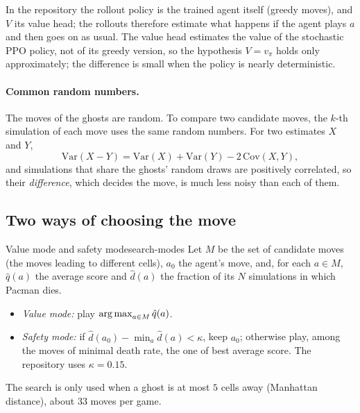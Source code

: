 In the repository the rollout policy is the trained agent itself (greedy
moves), and $V$ its value head; the rollouts therefore estimate what
happens if the agent plays $a$ and then goes on as usual. The value head
estimates the value of the stochastic PPO policy, not of its greedy
version, so the hypothesis $V = v_\pi$ holds only approximately; the
difference is small when the policy is nearly deterministic.

\paragraph{Common random numbers.} The moves of the ghosts are random. To
compare two candidate moves, the $k$-th simulation of each move uses the
same random numbers. For two estimates $X$ and $Y$,
\begin{equation}
  \mathrm{Var}(X - Y) = \mathrm{Var}(X) + \mathrm{Var}(Y) - 2\,
  \mathrm{Cov}(X, Y),
\end{equation}
and simulations that share the ghosts' random draws are positively
correlated, so their \emph{difference}, which decides the move, is much
less noisy than each of them.

\subsection{Two ways of choosing the move}

\begin{definition}{Value mode and safety mode}{search-modes}
  Let $M$ be the set of candidate moves (the moves leading to different
  cells), $a_0$ the agent's move, and, for each $a \in M$, $\hat q(a)$ the
  average score and $\hat d(a)$ the fraction of its $N$ simulations in
  which Pacman dies.
  \begin{itemize}[nosep]
    \item \emph{Value mode:} play $\operatorname*{arg\,max}_{a \in M} \hat q(a)$.
    \item \emph{Safety mode:} if $\hat d(a_0) - \min_a \hat d(a) <
      \kappa$, keep $a_0$; otherwise play, among the moves of minimal death
      rate, the one of best average score. The repository uses $\kappa =
      0.15$.
  \end{itemize}
  The search is only used when a ghost is at most $5$ cells away
  (Manhattan distance), about $33$ moves per game.
\end{definition}

